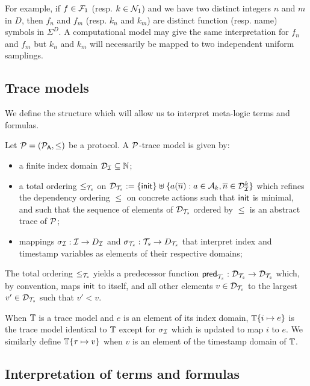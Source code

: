 For example, if $f \in \mathcal{F}_1$ (resp. $k \in \mathcal{N}_1$) and we have two distinct
integers $n$ and $m$ in $D$, then $f_n$ and $f_m$ (resp. $k_n$ and $k_m$)
are distinct function (resp. name) symbols in $\Sigma^D$.
A computational model may give the same interpretation for $f_n$ and $f_m$
but $k_n$ and $k_m$ will necessarily be mapped to two independent uniform
samplings.

\subsection{Trace models}

We define the structure which will allow us to interpret meta-logic
terms and formulas.

\begin{definition}
  Let $\mathcal{P} = (\mathcal{P}_{\textsf{A}}, \leq)$ be a protocol. 
  A $\mathcal{P}$-trace model is given by:
  \begin{itemize}
    \item a finite index domain $\mathcal{D}_{\mathcal{I}} \subseteq \mathbb{N}$;
    \item a total ordering $\leq_{\mathcal{T}_s}$ on
      $\mathcal{D}_{\mathcal{T}_s} := \{ \mathsf{init} \} \uplus \{ a(\overline{n}) : a\in\mathcal{A}_k, \overline{n}\in\mathcal{D}_{\mathcal{I}}^k
      \}$ which refines the dependency ordering $\leq$ on concrete actions such
      that $\mathsf{init}$ is minimal, and such that the sequence of elements of $\mathcal{D}_{\mathcal{T}_s}$ ordered by $\leq$ is an
      abstract trace of $\mathcal{P}$;
    \item mappings $\sigma_{\mathcal{I}} : \mathcal{I} \to D_{\mathcal{I}}$
      and $\sigma_{\mathcal{T}_s} : {\mathcal{T}_s} \to D_{\mathcal{T}_s}$ that interpret index and
      timestamp variables as elements of their respective domains;
  \end{itemize}
\end{definition}

The total ordering $\leq_{\mathcal{T}_s}$ yields a predecessor function
$\mathsf{pred}_{\mathcal{T}_s} : \mathcal{D}_{\mathcal{T}_s}\to\mathcal{D}_{\mathcal{T}_s}$ which,
by convention, maps $\mathsf{init}$ to itself,
and all other elements $v \in \mathcal{D}_{\mathcal{T}_s}$ to the largest $v' \in \mathcal{D}_{\mathcal{T}_s}$ such that
$v' < v$.

When $\mathbb{T}$ is a trace model and $e$ is an element of its index domain,
$\mathbb{T}\{i\mapsto e\}$ is the trace model identical to $\mathbb{T}$ except for
$\sigma_{\mathcal{I}}$ which is updated to map $i$ to $e$. We similarly define
$\mathbb{T}\{\tau\mapsto v\}$ when $v$ is an element of the timestamp domain of $\mathbb{T}$.

\subsection{Interpretation of terms and formulas}

